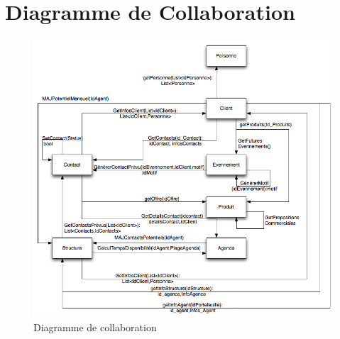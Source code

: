 \section{Diagramme de Collaboration}

\begin{figure}[H]
	\begin{center}
		\includegraphics[scale=0.4]{Includes/COLLAB.png}
		\caption{Diagramme de collaboration}
	\end{center}
\end{figure}
